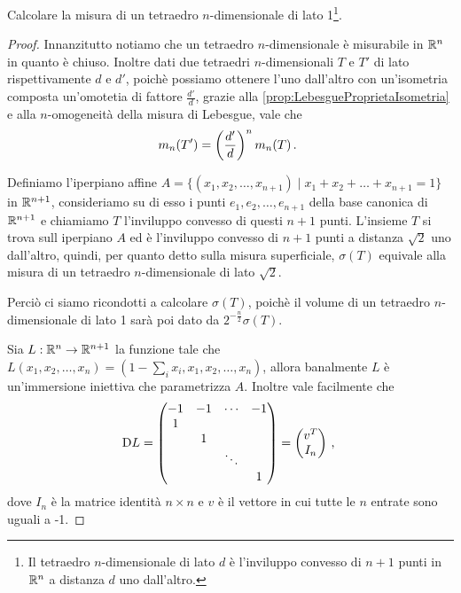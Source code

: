 \begin{exercise}\label{es:MisuraTetraedro}
	Calcolare la misura di un tetraedro $n$-dimensionale di lato 1\footnote{Il tetraedro $n$-dimensionale di lato $d$ è l'inviluppo convesso di $n+1$ punti in $\mathbb R^n$ a distanza $d$ uno dall'altro.}.
\end{exercise}
\begin{proof}
	Innanzitutto notiamo che un tetraedro $n$-dimensionale è misurabile in $\mathbb R^n$ in quanto è chiuso.
	Inoltre  dati due tetraedri $n$-dimensionali $T$ e $T'$ di lato rispettivamente $d$ e $d'$, poichè possiamo ottenere l'uno dall'altro con un'isometria composta un'omotetia di fattore $\frac{d'}d$, grazie alla \cref{prop:LebesgueProprietaIsometria} e alla $n$-omogeneità della misura di Lebesgue, vale che 
	\begin{equation*} 
		m_n(T')=\left(\frac{d'}{d}\right)^nm_n(T)\, \text{. }
	\end{equation*}

	Definiamo l'iperpiano affine $A=\{(x_1,x_2,\ldots,x_{n+1}) \mid x_1+x_2+\ldots +x_{n+1}=1\}$ in $\mathbb R^{n+1}$, consideriamo su di esso i punti $e_1,e_2,\ldots,e_{n+1}$ della base canonica di $\mathbb R^{n+1}$ e chiamiamo $T$ l'inviluppo convesso di questi $n+1$ punti. 
	L'insieme $T$ si trova sull iperpiano $A$ ed è l'inviluppo convesso di $n+1$ punti a distanza $\sqrt 2$ uno dall'altro, quindi, per quanto detto sulla misura superficiale, $\sigma(T)$ equivale alla misura di un tetraedro $n$-dimensionale di lato $\sqrt 2$. %

	Perciò ci siamo ricondotti a calcolare $\sigma(T)$, poichè il volume di un tetraedro $n$-dimensionale di lato 1 sarà poi dato da $2^{-\frac n2}\sigma(T)$.

	Sia $L:\mathbb R^n\to\mathbb R^{n+1}$ la funzione tale che $L(x_1,x_2,\ldots,x_n)=(1-\sum_ix_i,x_1,x_2,\ldots,x_n)$, allora banalmente $L$ è un'immersione iniettiva che parametrizza $A$. Inoltre vale facilmente che 
	\begin{equation*}
		\mathrm D L=\begin{pmatrix}
		        	-1	& -1 & \cdots & -1\\
					1 & & & \\
					 & 1 & & \\
					 & &\ddots& \\
					 & & & 1
		        \end{pmatrix}=
		        \begin{pmatrix}
		        	v^T\\
		        	I_n
		        \end{pmatrix}\, \text{, }
	\end{equation*}
	dove $I_n$ è la matrice identità $n\times n$ e $v$ è il vettore in cui tutte le $n$ entrate sono uguali a -1.
	

\end{proof}
